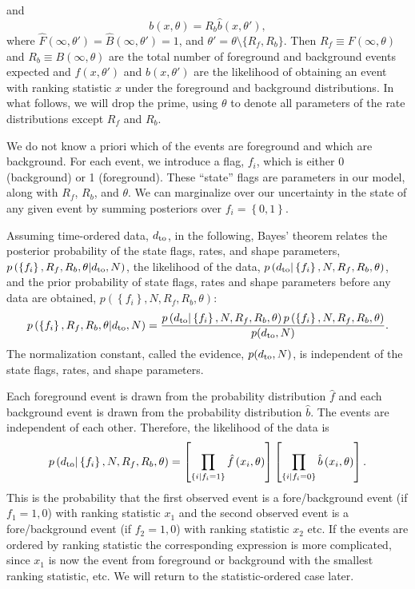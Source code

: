 \documentclass[aps,prd]{revtex4-1}
\newcommand{\mathset}[1]{\left\{ #1 \right\}}
\begin{document}
and
\begin{equation}
  b(x, \theta) = R_b \hat{b}(x, \theta'),
\end{equation}
where $\hat{F}(\infty, \theta') = \hat{B}(\infty, \theta') = 1$, and
$\theta' = \theta \setminus \{R_{f}, R_{b} \}$.  Then $R_f \equiv
F(\infty,\theta)$ and $R_b \equiv B(\infty,\theta)$ are the total
number of foreground and background events expected and $\hat{f}(x,
\theta')$ and $\hat{b}(x, \theta')$ are the likelihood of obtaining an
event with ranking statistic $x$ under the foreground and background
distributions.  In what follows, we will drop the prime, using
$\theta$ to denote all parameters of the rate distributions except
$R_f$ and $R_b$.

We do not know a priori which of the events are foreground and which
are background.  For each event, we introduce a flag, $f_i$, which is
either 0 (background) or 1 (foreground).  These ``state'' flags are
parameters in our model, along with $R_f$, $R_b$, and $\theta$.  We
can marginalize over our uncertainty in the state of any given event
by summing posteriors over $f_i = \mathset{0,1}$.

Assuming time-ordered data, $d_{\rm to}$, in the following, Bayes'
theorem relates the posterior probability of the state flags, rates,
and shape parameters, $p\left(\mathset{f_i}, R_f, R_b, \theta | d_{\rm
  to}, N \right)$, the likelihood of the data, $p\left( d_{\rm to} |
\mathset{f_i}, N, R_f, R_b, \theta\right)$, and the prior probability
of state flags, rates and shape parameters before any data are
obtained, $p\left( \mathset{f_i}, N, R_f, R_b, \theta\right)$:
\begin{equation}
  \label{eq:Bayes}
  p\left(\mathset{f_i}, R_f, R_b, \theta | d_{\rm to}, N \right) =
  \frac{p\left( d_{\rm to} | \mathset{f_i}, N, R_f, R_b, \theta\right)
    p\left(\mathset{f_i}, N, R_f, R_b, \theta\right)}{p(d_{\rm to},
    N)}.
\end{equation}
The normalization constant, called the evidence, $p(d_{\rm to}, N)$,
is independent of the state flags, rates, and shape parameters.

Each foreground event is drawn from the probability distribution
$\hat{f}$ and each background event is drawn from the probability
distribution $\hat{b}$.  The events are independent of each other.
Therefore, the likelihood of the data is
\begin{equation}
  p\left( d_{\rm to} | \mathset{f_i}, N, R_f, R_b, \theta\right) =
  \left[ \prod_{\mathset{i | f_i = 1}} \hat{f}\left(x_i, \theta\right)
    \right] \left[ \prod_{\mathset{i | f_i = 0}} \hat{b}\left( x_i,
    \theta\right) \right].
\end{equation}
This is the probability that the first observed event is a
fore/background event (if $f_1=1,0$) with ranking statistic $x_1$ and
the second observed event is a fore/background event (if $f_2=1,0$)
with ranking statistic $x_2$ etc. If the events are ordered by ranking
statistic the corresponding expression is more complicated, since
$x_1$ is now the event from foreground or background with the
smallest ranking statistic, etc. We will return to the
statistic-ordered case later.
\end{document}
